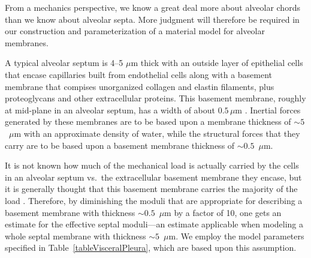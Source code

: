 From a mechanics perspective, we know a great deal more about alveolar chords than we know about alveolar septa.  More judgment will therefore be required in our construction and parameterization of a material model for alveolar membranes.  

A typical alveolar septum is 4--5 $\mu$m thick \cite{Sukietal11} with an outside layer of epithelial cells that encase capillaries built from endothelial cells along with a basement membrane that compises unorganized collagen and elastin filaments, plus proteoglycans and other extracellular proteins.  This basement membrane, roughly at mid-plane in an alveolar septum, has a width of about $0.5 \, \mu$m \cite{RoanWaters11}.  Inertial forces generated by these membranes are to be based upon a membrane thickness of $\sim\!\!5$~$\mu$m with an approximate density of water, while the structural forces that they carry are to be based upon a basement membrane thickness of $\sim\!\! 0.5$~$\mu$m.  

It is not known how much of the mechanical load is actually carried by the cells in an alveolar septum vs.\ the extracellular basement membrane they encase, but it is generally thought that this basement membrane carries the majority of the load \cite{Sukietal11}.  Therefore, by diminishing the moduli that are appropriate for describing a basement membrane with thickness $\sim\!\! 0.5$~$\mu$m by a factor of 10, one gets an estimate for the effective septal moduli---an estimate applicable when modeling a whole septal membrane with thickness $\sim\!\! 5$~$\mu$m.  We employ the model parameters specified in Table~\ref{tableVisceralPleura}, which are based upon this assumption.


